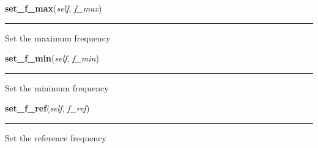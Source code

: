     \label{stochastic:StochasticNode:set_f_max}
    \vspace{0.5ex}

    \begin{boxedminipage}{\textwidth}

    \raggedright \textbf{set\_f\_max}(\textit{self}, \textit{f\_max})

    \vspace{-1.5ex}

    \rule{\textwidth}{0.5\fboxrule}
    Set the maximum frequency

    \vspace{1ex}

    \end{boxedminipage}

    \label{stochastic:StochasticNode:set_f_min}
    \vspace{0.5ex}

    \begin{boxedminipage}{\textwidth}

    \raggedright \textbf{set\_f\_min}(\textit{self}, \textit{f\_min})

    \vspace{-1.5ex}

    \rule{\textwidth}{0.5\fboxrule}
    Set the minimum frequency

    \vspace{1ex}

    \end{boxedminipage}

    \label{stochastic:StochasticNode:set_f_ref}
    \vspace{0.5ex}

    \begin{boxedminipage}{\textwidth}

    \raggedright \textbf{set\_f\_ref}(\textit{self}, \textit{f\_ref})

    \vspace{-1.5ex}

    \rule{\textwidth}{0.5\fboxrule}
    Set the reference frequency

    \vspace{1ex}

    \end{boxedminipage}

